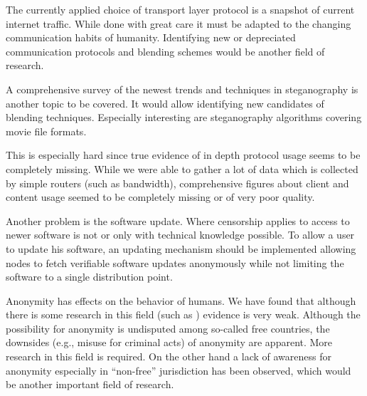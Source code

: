 The currently applied choice of transport layer protocol is a snapshot of current internet traffic. While done with great care it must be adapted to the changing communication habits of humanity. Identifying new or depreciated communication protocols and blending schemes would be another field of research.

A comprehensive survey of the newest trends and techniques in steganography is another topic to be covered. It would allow identifying new candidates of blending techniques. Especially interesting are steganography algorithms covering movie file formats.

This is especially hard since true evidence of in depth protocol usage seems to be completely missing. While we were able to gather a lot of data which is collected by simple routers (such as bandwidth), comprehensive figures about client and content usage seemed to be completely missing or of very poor quality.

Another problem is the software update. Where censorship applies to access to newer software is not or only with technical knowledge possible. To allow a user to update his software, an updating mechanism should be implemented allowing nodes to fetch verifiable software updates anonymously while not limiting the software to a single distribution point.

Anonymity has effects on the behavior of humans. We have found that although there is some research in this field (such as \cite{postmes2001social}) evidence is very weak. Although the possibility for anonymity is undisputed among so-called free countries, the downsides (e.g., misuse for criminal acts) of anonymity are apparent. More research in this field is required. On the other hand a lack of awareness for anonymity especially in ``non-free'' jurisdiction has been observed, which would be another important field of research. 


